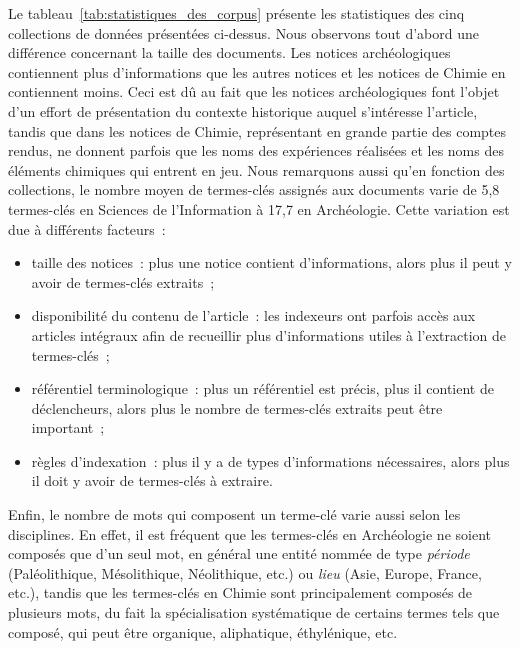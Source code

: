   Le tableau~\ref{tab:statistiques_des_corpus} présente les statistiques des
  cinq collections de données présentées ci-dessus. Nous observons tout d'abord
  une différence concernant la taille des documents. Les notices archéologiques
  contiennent plus d'informations que les autres notices et les notices de
  Chimie en contiennent moins. Ceci est dû au fait que les notices
  archéologiques font l'objet d'un effort de présentation du contexte historique
  auquel s'intéresse l'article, tandis que dans les notices de Chimie,
  représentant en grande partie des comptes rendus, ne donnent parfois que les
  noms des expériences réalisées et les noms des éléments chimiques qui entrent
  en jeu. Nous remarquons aussi qu'en fonction des collections, le nombre moyen
  de termes-clés assignés aux documents varie de 5,8 termes-clés en Sciences de
  l'Information à 17,7 en Archéologie. Cette variation est due à différents
  facteurs~:
  \begin{itemize}
    \item{taille des notices~: plus une notice contient d'informations, alors
          plus il peut y avoir de termes-clés extraits~;}
    \item{disponibilité du contenu de l'article~: les indexeurs ont parfois
          accès aux articles intégraux afin de recueillir plus d'informations
          utiles à l'extraction de termes-clés~;}
    \item{référentiel terminologique~: plus un référentiel est précis, plus il
          contient de déclencheurs, alors plus le nombre de termes-clés extraits
          peut être important~;}
    \item{règles d'indexation~: plus il y a de types d'informations nécessaires,
          alors plus il doit y avoir de termes-clés à extraire.}
  \end{itemize}
  Enfin, le nombre de mots qui composent un terme-clé varie aussi selon les
  disciplines. En effet, il est fréquent que les termes-clés en Archéologie ne
  soient composés que d'un seul mot, en général une entité nommée de type
  \textit{période} (\og{}Paléolithique\fg{}, \og{}Mésolithique\fg{},
  \og{}Néolithique\fg{}, etc.) ou \textit{lieu} (\og{}Asie\fg{},
  \og{}Europe\fg{}, \og{}France\fg{}, etc.), tandis que les termes-clés en
  Chimie sont principalement composés de plusieurs mots, du fait la
  spécialisation systématique de certains termes tels que \og{}composé\fg{}, qui
  peut être \og{}organique\fg{}, \og{}aliphatique\fg{}, \og{}éthylénique\fg{},
  etc.
